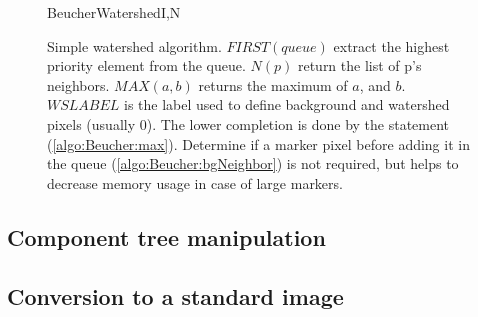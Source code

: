\documentclass{InsightArticle}
\begin{document}
\begin{figure}[htbp]
\begin{pseudocode}[framebox]{BeucherWatershed}{I,N}
\end{pseudocode}
\caption{Simple watershed algorithm.\label{BeucherAlgorithm} $FIRST(queue)$ extract the highest priority element from the queue. $N(p)$ return the list of p's neighbors. $MAX(a,b)$ returns the maximum of $a$, and $b$. $WSLABEL$ is the label used to define background and watershed pixels (usually $0$). The lower completion is done by the statement (\ref{algo:Beucher:max}). Determine if a marker pixel before adding it in the queue (\ref{algo:Beucher:bgNeighbor}) is not required, but helps to decrease memory usage in case of large markers.}
\end{figure}

  \subsection{Component tree manipulation}

  \subsection{Conversion to a standard image}
\end{document}
